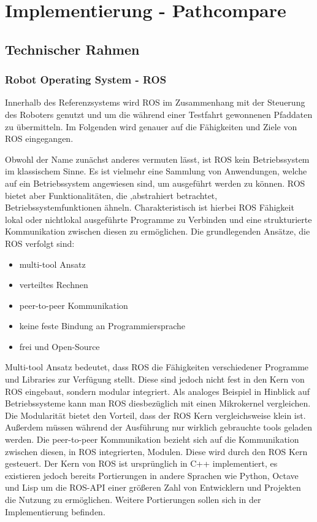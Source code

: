 \chapter{Implementierung - Pathcompare}
\label{sec:implementierung}
\section{Technischer Rahmen}

\subsection{Robot Operating System - ROS}

Innerhalb des Referenzsystems wird \gls{ROS} im Zusammenhang mit der Steuerung
des Roboters genutzt und um die während einer Testfahrt gewonnenen Pfaddaten
zu übermitteln. Im Folgenden wird genauer auf die Fähigkeiten und
Ziele von ROS eingegangen.

Obwohl der Name zunächst anderes vermuten lässt, ist ROS kein
Betriebssystem im klassischem Sinne. Es ist vielmehr eine Sammlung von
Anwendungen, welche auf ein Betriebssystem angewiesen sind, um ausgeführt werden
zu können. ROS bietet aber Funktionalitäten, die ,abstrahiert betrachtet,
Betriebssystemfunktionen ähneln. Charakteristisch ist hierbei ROS Fähigkeit
lokal oder nichtlokal ausgeführte Programme zu Verbinden und eine
strukturierte Kommunikation zwischen diesen zu ermöglichen. Die grundlegenden
Ansätze, die ROS verfolgt sind:

\begin{itemize}
  \item multi-tool Ansatz
  \item verteiltes Rechnen 
  \item peer-to-peer Kommunikation
  \item keine feste Bindung an Programmiersprache
  \item frei und Open-Source
\end{itemize}

Multi-tool Ansatz bedeutet, dass ROS die Fähigkeiten verschiedener Programme
und Libraries zur Verfügung stellt. Diese sind jedoch nicht fest in den Kern
von ROS eingebaut, sondern modular integriert. Als analoges Beispiel in
Hinblick auf Betriebssysteme kann man ROS diesbezüglich mit einen Mikrokernel
vergleichen. Die Modularität bietet den Vorteil, dass der ROS Kern
vergleichsweise klein ist. Außerdem müssen während der Ausführung nur wirklich
gebrauchte tools geladen werden. Die peer-to-peer Kommunikation bezieht
sich auf die Kommunikation zwischen diesen, in ROS integrierten, Modulen. Diese
wird durch den ROS Kern gesteuert. Der Kern von ROS ist ursprünglich in C++
implementiert, es existieren jedoch bereits Portierungen in andere Sprachen wie
Python, Octave und Lisp um die ROS-\gls{API} einer größeren Zahl von
Entwicklern und Projekten die Nutzung zu ermöglichen. Weitere Portierungen
sollen sich in der Implementierung befinden.

